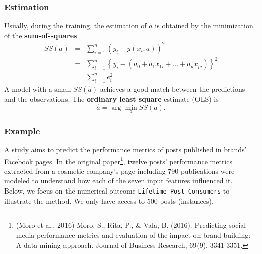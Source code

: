 \begin{frame}
\frametitle{Estimation}
Usually, during the training, the estimation of $a$ is obtained by the minimization of the {\bf sum-of-squares}
\begin{eqnarray*}
SS(a) &=& \sum_{i=1}^n \left(y_i - y(x_i;a)\right)^2 \\
&=& \sum_{i=1}^n \left\{y_i - (a_0 + a_1 x_{1i} + \ldots + a_p x_{pi})\right\}^2\\
&=& \sum_{i=1}^n e_i^2
\end{eqnarray*}
A model with a small $SS(\hat{a})$ achieves a good match between the predictions and the observations. The {\bf ordinary least square} estimate (OLS) is
$$
\hat{a} = \arg\min_a SS(a).
$$
\end{frame}
\begin{frame}
\frametitle{Example}
A study aims to predict the performance metrics of posts published
in brands' Facebook pages. In the original paper\footnote{(Moro et al., 2016) Moro, S., Rita, P., $\&$ Vala, B. (2016). Predicting social media performance metrics and evaluation of the impact on brand building: A data mining approach. Journal of Business Research, 69(9), 3341-3351.}, twelve posts' performance metrics extracted from a cosmetic company's page including 790 publications were modeled to understand how each of the seven input features influenced it. \\
\vspace{0.2cm}
Below, we focus on the numerical outcome {\tt Lifetime Post Consumers} to illustrate the method. We only have access to 500 posts (instances).
\end{frame}
